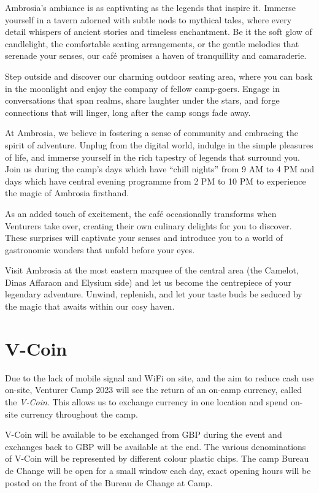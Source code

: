 \documentclass[a4paper, 11pt]{report}
\begin{document}
Ambrosia's ambiance is as captivating as the legends that inspire it. Immerse yourself in a tavern adorned with subtle nods to mythical tales, where every detail whispers of ancient stories and timeless enchantment. Be it the soft glow of candlelight, the comfortable seating arrangements, or the gentle melodies that serenade your senses, our café promises a haven of tranquillity and camaraderie.\nl

Step outside and discover our charming outdoor seating area, where you can bask in the moonlight and enjoy the company of fellow camp-goers. Engage in conversations that span realms, share laughter under the stars, and forge connections that will linger, long after the camp songs fade away.\nl

At Ambrosia, we believe in fostering a sense of community and embracing the spirit of adventure. Unplug from the digital world, indulge in the simple pleasures of life, and immerse yourself in the rich tapestry of legends that surround you. Join us during the camp's days which have “chill nights” from 9 AM to 4 PM and days which have central evening programme from 2 PM to 10 PM to experience the magic of Ambrosia firsthand.\nl

As an added touch of excitement, the café occasionally transforms when Venturers take over, creating their own culinary delights for you to discover. These surprises will captivate your senses and introduce you to a world of gastronomic wonders that unfold before your eyes.\nl

Visit Ambrosia at the most eastern marquee of the central area (the Camelot, Dinas Affaraon and Elysium side) and let us become the centrepiece of your legendary adventure. Unwind, replenish, and let your taste buds be seduced by the magic that awaits within our cosy haven.

\chapter{V-Coin}
Due to the lack of mobile signal and WiFi on site, and the aim to reduce cash use on-site, Venturer Camp 2023 will see the return of an on-camp currency, called the \textit{V-Coin}. This allows us to exchange currency in one location and spend on-site currency throughout the camp.\nl

V-Coin will be available to be exchanged from GBP during the event and exchanges back to GBP will be available at the end. The various denominations of V-Coin will be represented by different colour plastic chips. The camp Bureau de Change will be open for a small window each day, exact opening hours will be posted on the front of the Bureau de Change at Camp. \nl
\end{document}
